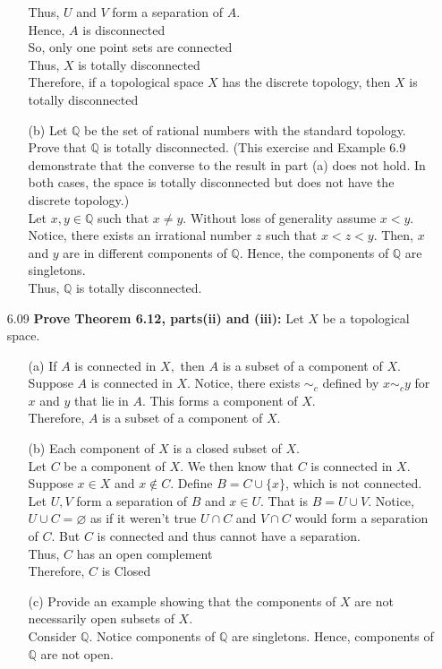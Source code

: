 \documentclass[12pt]{article}
\newcommand{\Q}{\mathbb{Q}}
\begin{document}
\begin{enumerate}
\begin{enumerate}
			Thus, $ U $ and $ V $ form a separation of $ A $.\\
			Hence, $ A $ is disconnected\\
			So, only one point sets are connected\\
			Thus, $ X $ is totally disconnected\\
			Therefore, if a topological space $X$ has the discrete topology, then $X$ is totally disconnected
			\item[(b)] Let $\mathbb { Q }$ be the set of rational numbers with the standard topology. Prove	that $\mathbb { Q }$ is totally disconnected. (This exercise and Example 6.9 demonstrate that the converse to the result in part (a) does not hold. In both cases, the space is totally disconnected but does not have the discrete topology.)\\
			Let $ x,y \in \mathbb{ Q } $ such that $ x\not=y $. Without loss of generality assume $ x<y $. Notice, there exists an irrational number $ z $ such that $ x<z<y $. Then, $ x $ and $ y $ are in different components of $ \mathbb{ Q } $. Hence, the components of $ \mathbb{ Q } $ are singletons.\\
			Thus, $ \mathbb{ Q } $ is totally disconnected.
		\end{enumerate}
		
		\item[6.09] \textbf{Prove Theorem 6.12, parts(ii) and (iii):} Let $ X $ be a topological space.
		\begin{enumerate}
			\item[(a)]If $A$ is connected in $X ,$ then $A$ is a subset of a component of $X .$\\
				Suppose $ A $ is connected in $ X $. Notice, there exists $ \sim_c $ defined by $ x \sim_c y $ for  $ x $ and $ y $ that lie in $A$. This forms a component of $ X $.\\
				Therefore, $ A $ is a subset of a component of $ X $.
			\item[(b)]Each component of $X$ is a closed subset of $X .$\\
				Let $ C $ be a component of $ X $. We then know that $ C $ is connected in $ X $. Suppose $ x \in X $ and $ x\notin C $. Define $ B = C\cup \{x\} $, which is not connected. Let $ U,V $ form a separation of $ B $ and $ x\in U $. That is $ B=U\cup V $. Notice, $ U\cup C = \varnothing $ as if it weren't true $ U\cap C $ and $ V\cap C $ would form a separation of $ C $. But $ C $ is connected and thus cannot have a separation. \\
				Thus, $ C $  has an open complement\\
				Therefore, $ C $ is Closed 
			\item[(c)] Provide an example showing that the components of $X$ are not necessarily
			open subsets of $X .$\\
			Consider $ \mathbb{ Q } $. Notice components of $ \mathbb{ Q } $ are singletons. Hence, components of $ \Q $ are not open.
		\end{enumerate}
		

\end{enumerate}
\end{document}
